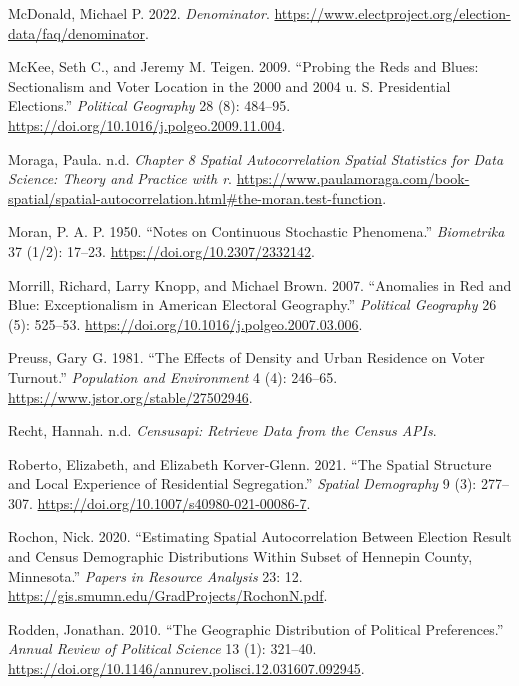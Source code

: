 \documentclass[
]{article}
\newlength{\cslhangindent}
\newenvironment{CSLReferences}[2] %
 {\begin{list}{}{%
  \setlength{\itemindent}{0pt}
  \setlength{\leftmargin}{0pt}
  \setlength{\parsep}{0pt}
  \ifodd #1
   \setlength{\leftmargin}{\cslhangindent}
   \setlength{\itemindent}{-1\cslhangindent}
  \fi
  \setlength{\itemsep}{#2\baselineskip}}}
 {\end{list}}
\begin{document}
\begin{CSLReferences}{1}{1}
McDonald, Michael P. 2022. \emph{Denominator}.
\url{https://www.electproject.org/election-data/faq/denominator}.

McKee, Seth C., and Jeremy M. Teigen. 2009. {``Probing the Reds and
Blues: Sectionalism and Voter Location in the 2000 and 2004 u. S.
Presidential Elections.''} \emph{Political Geography} 28 (8): 484--95.
\url{https://doi.org/10.1016/j.polgeo.2009.11.004}.

Moraga, Paula. n.d. \emph{Chapter 8 Spatial Autocorrelation \textbar{}
Spatial Statistics for Data Science: Theory and Practice with r}.
\url{https://www.paulamoraga.com/book-spatial/spatial-autocorrelation.html\#the-moran.test-function}.

Moran, P. A. P. 1950. {``Notes on Continuous Stochastic Phenomena.''}
\emph{Biometrika} 37 (1/2): 17--23.
\url{https://doi.org/10.2307/2332142}.

Morrill, Richard, Larry Knopp, and Michael Brown. 2007. {``Anomalies in
Red and Blue: Exceptionalism in American Electoral Geography.''}
\emph{Political Geography} 26 (5): 525--53.
\url{https://doi.org/10.1016/j.polgeo.2007.03.006}.

Preuss, Gary G. 1981. {``The Effects of Density and Urban Residence on
Voter Turnout.''} \emph{Population and Environment} 4 (4): 246--65.
\url{https://www.jstor.org/stable/27502946}.

Recht, Hannah. n.d. \emph{Censusapi: Retrieve Data from the Census
APIs}.

Roberto, Elizabeth, and Elizabeth Korver-Glenn. 2021. {``The Spatial
Structure and Local Experience of Residential Segregation.''}
\emph{Spatial Demography} 9 (3): 277--307.
\url{https://doi.org/10.1007/s40980-021-00086-7}.

Rochon, Nick. 2020. {``Estimating Spatial Autocorrelation Between
Election Result and Census Demographic Distributions Within Subset of
Hennepin County, Minnesota.''} \emph{Papers in Resource Analysis} 23:
12. \url{https://gis.smumn.edu/GradProjects/RochonN.pdf}.

Rodden, Jonathan. 2010. {``The Geographic Distribution of Political
Preferences.''} \emph{Annual Review of Political Science} 13 (1):
321--40. \url{https://doi.org/10.1146/annurev.polisci.12.031607.092945}.


\end{CSLReferences}
\end{document}
